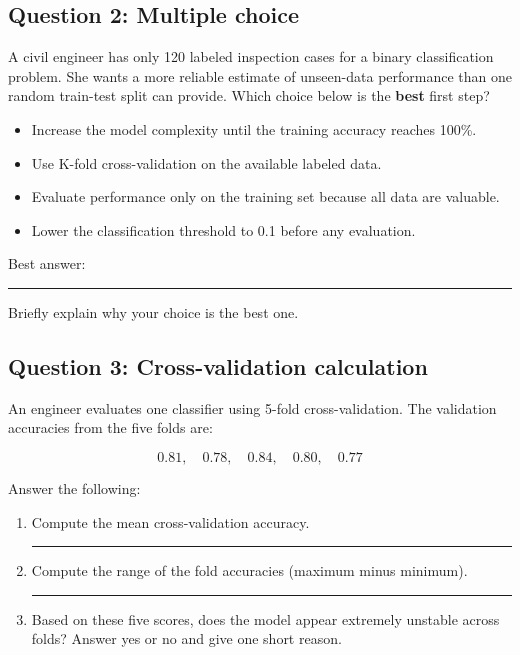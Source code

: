 \documentclass[12pt]{article}
\begin{document}
\subsection*{Question 2: Multiple choice}
A civil engineer has only 120 labeled inspection cases for a binary classification problem. She wants a more reliable estimate of unseen-data performance than one random train-test split can provide. Which choice below is the \textbf{best} first step?

\begin{itemize}
    \item [A.] Increase the model complexity until the training accuracy reaches 100\%.
    \item [B.] Use K-fold cross-validation on the available labeled data.
    \item [C.] Evaluate performance only on the training set because all data are valuable.
    \item [D.] Lower the classification threshold to 0.1 before any evaluation.
\end{itemize}

Best answer: \rule{1in}{0.15mm}

\bigskip

Briefly explain why your choice is the best one.\\


\vspace{20pt}
\fullunderline

\vspace{20pt}
\fullunderline

\subsection*{Question 3: Cross-validation calculation}
An engineer evaluates one classifier using 5-fold cross-validation. The validation accuracies from the five folds are:

\[
0.81,\quad 0.78,\quad 0.84,\quad 0.80,\quad 0.77
\]

Answer the following:

\begin{enumerate}[label=(\alph*)]
    \item Compute the mean cross-validation accuracy.\\
    \rule{2in}{0.15mm}
    \item Compute the range of the fold accuracies (maximum minus minimum).\\
    \rule{2in}{0.15mm}
    \item Based on these five scores, does the model appear extremely unstable across folds? Answer yes or no and give one short reason.\\
    \fullunderline
\end{enumerate}
\end{document}
